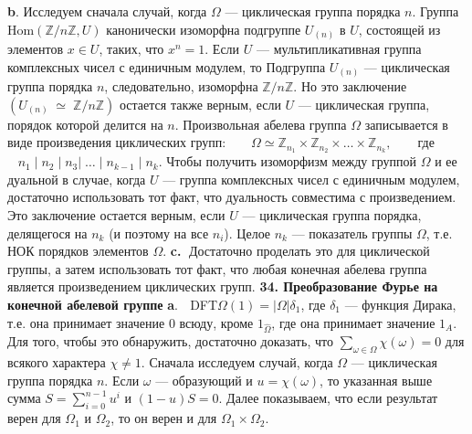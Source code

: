 \documentclass{../../template/mai_book}
\begin{document}
\textbf{b}. Исследуем сначала случай, когда $\Omega$ --- циклическая группа поряд­ка $n$. Группа Hom$(\mathds{Z}/n \mathds{Z},U)$ канонически изоморфна подгруппе $U_{(n)}$ в $U$, состоящей из элементов $x \in U$, таких, что $x^n = 1$. Если $U$ --- мультипликативная группа комплексных чисел с единичным модулем, то	
\newpage
\noindent
Подгруппа $U_{(n)}$ --- циклическая группа порядка $n$, следовательно, изоморфна $\mathds{Z}/n\mathds{Z}$. Но это заключение $(U_{(n)} \; \simeq \; \mathds{Z}/n\mathds{Z})$ остается также верным, если $U$ --- циклическая группа, порядок которой делится на $n$. \newline
\indent Произвольная абелева группа $\Omega$ записывается в виде произведения циклических групп: \newline \newline \indent
$\; \; \; \; \; \; \Omega \simeq \mathds{Z}_{n_1} \times \mathds{Z}_{n_2} \times \dots \times \mathds{Z}_{n_k}, \; \; \; \; \; \;$ где $\; \; \; n_1 \; | \; n_2 \; | \; n_3 | \; \dots \; | \; n_{k-1} \; | \; n_k$. \newline \newline
Чтобы получить изоморфизм между группой $\Omega$ и ее дуальной в случае, когда $U$ --- группа комплексных чисел с единичным модулем, достаточно использовать тот факт, что дуальность совместима с произведением. Это заключение остается верным, если $U$ --- циклическая группа порядка, делящегося на $n_k$ (и поэтому на все $n_i$). Целое $n_k$ --- показатель группы $\Omega$, т.е. НОК порядков элементов $\Omega$. \newline \indent
\textbf{c.}$\;$ Достаточно проделать это для циклической группы, а затем использовать тот факт, что любая конечная абелева группа является произведением циклических групп. \newline \newline
\textbf{34. Преобразование Фурье на конечной абелевой группе} \newline \newline \indent
\textbf{a}. $\;$ DFT{\scriptsize $\Omega$}$(1) = |\Omega|\delta_1$, где $\delta_1$ --- функция Дирака, т.е. она принимает значение $0$ всюду, кроме $1_{\hat \Omega}$, где она принимает значение $1_A$. Для того, чтобы это обнаружить, достаточно доказать, что $\sum_{\omega \in \Omega} \chi(\omega) = 0$ для всякого характера $\chi \neq 1$. Сначала исследуем случай, когда $\Omega$ --- циклическая группа порядка $n$. Если $\omega$ --- образующий и $u = \chi(\omega)$, то указанная выше сумма $S = \sum_{i = 0}^{n-1}u^i$ и $(1 - u)S = 0$. Далее показываем, что если результат верен для $\Omega_1$ и $\Omega_2$, то он верен и для $\Omega_1 \times \Omega_2$. \newline \indent
\end{document}
